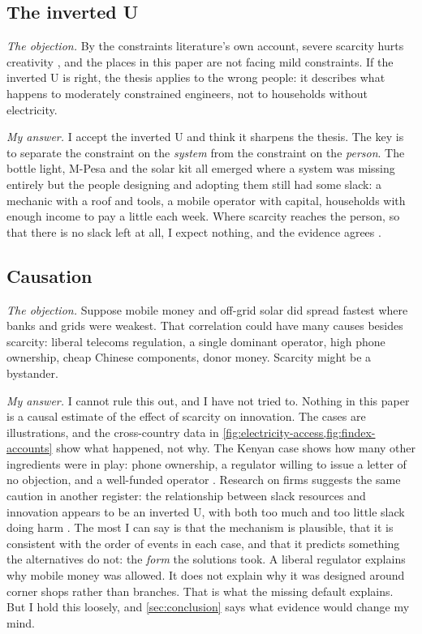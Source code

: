 \subsection{The inverted U}

\emph{The objection.} By the constraints literature's own account, severe
scarcity hurts creativity \parencite{acar2019}, and the places in this paper
are not facing mild constraints. If the inverted U is right, the thesis
applies to the wrong people: it describes what happens to moderately
constrained engineers, not to households without electricity.

\emph{My answer.} I accept the inverted U and think it sharpens the thesis.
The key is to separate the constraint on the \emph{system} from the constraint
on the \emph{person}. The bottle light, M-Pesa and the solar kit all emerged
where a system was missing entirely but the people designing and adopting them
still had some slack: a mechanic with a roof and tools, a mobile operator with
capital, households with enough income to pay a little each week. Where
scarcity reaches the person, so that there is no slack left at all, I expect
nothing, and the evidence agrees \parencite{mani2013}.

\subsection{Causation}

\emph{The objection.} Suppose mobile money and off-grid solar did spread fastest
where banks and grids were weakest. That correlation could have many causes
besides scarcity: liberal telecoms regulation, a single dominant operator, high
phone ownership, cheap Chinese components, donor money. Scarcity might be a
bystander.

\emph{My answer.} I cannot rule this out, and I have not tried to. Nothing in
this paper is a causal estimate of the effect of scarcity on innovation. The
cases are illustrations, and the cross-country data in
\cref{fig:electricity-access,fig:findex-accounts} show what happened, not why.
The Kenyan case shows how many other ingredients were in play: phone ownership,
a regulator willing to issue a letter of no objection, and a well-funded
operator \parencite{afi2010}. Research on firms suggests the same caution in
another register: the relationship between slack resources and innovation
appears to be an inverted U, with both too much and too little slack doing
harm \parencite{nohria1996}. The most I can say is that the mechanism is plausible, that it is
consistent with the order of events in each case, and that it predicts
something the alternatives do not: the \emph{form} the solutions took. A
liberal regulator explains why mobile money was allowed. It does not explain
why it was designed around corner shops rather than branches. That is what the
missing default explains. But I hold this loosely, and \cref{sec:conclusion}
says what evidence would change my mind.
